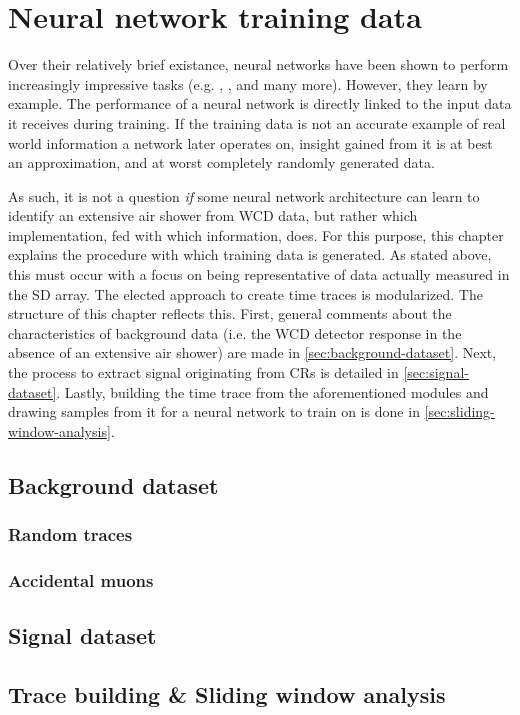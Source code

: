 
\chapter{Neural network training data}
\label{chap:neural-network-data}

Over their relatively brief existance, neural networks have been shown to perform increasingly impressive tasks (e.g.  \cite{openai2019dota}, \cite{openai2023gpt4}, 
and many more). However, they learn by example. The performance of a neural network is directly linked to the input data it receives during training. If the 
training data is not an accurate example of real world information a network later operates on, insight gained from it is at best an approximation, and at worst
completely randomly generated data. 

As such, it is not a question \textit{if} some neural network architecture can learn to identify an extensive air shower from WCD data, but rather which 
implementation, fed with which information, does. For this purpose, this chapter explains the procedure with which training data is generated. As stated above, this
must occur with a focus on being representative of data actually measured in the SD array. The elected approach to create time traces is modularized. The structure
of this chapter reflects this. First, general comments about the characteristics of background data (i.e. the WCD detector response in the absence of an extensive 
air shower) are made in \autoref{sec:background-dataset}. Next, the process to extract signal originating from CRs is detailed in \autoref{sec:signal-dataset}.
Lastly, building the time trace from the aforementioned modules and drawing samples from it for a neural network to train on is done in 
\autoref{sec:sliding-window-analysis}.

\section{Background dataset}
\label{sec:background-dataset}

\subsection{Random traces}
\label{ssec:random-traces}



\subsection{Accidental muons}
\label{ssec:accidental-muons}



\section{Signal dataset}
\label{sec:signal-dataset}


\section{Trace building \& Sliding window analysis}
\label{sec:sliding-window-analysis}